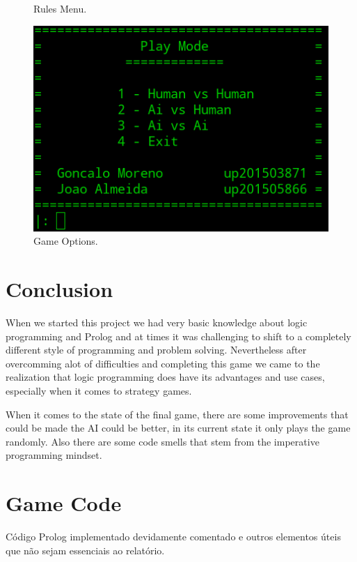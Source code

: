 \documentclass[a4paper]{article}
\begin{document}
\begin{figure}[H]
  \caption{Rules Menu.}\label{fig:menu_info}
\endminipage \hspace{2mm}
%
  \includegraphics[width=\linewidth]{menu_play.png}\hspace{0.5cm}
  \caption{Game Options.}\label{fig:menu_play}
\endminipage\hfill


\end{figure}

%



\section{Conclusion}
When we started this project we had very basic knowledge about logic programming and Prolog and at times
it was challenging to shift to a completely different style of programming and problem solving.
Nevertheless after overcomming alot of difficulties and completing this game we came to the realization
that logic programming does have its advantages and use cases, especially when it comes to strategy games.
\par
When it comes to the state of the final game, there are some improvements that could be made the AI could be better,
in its current state it only plays the game randomly. Also there are some code smells that stem from the imperative programming
mindset.





\clearpage
{}
\renewcommand\refname{Bibliografia}



\newpage
\appendix
\section{Game Code}
Código Prolog implementado devidamente comentado e outros elementos úteis que não sejam essenciais ao relatório.
\end{document}
